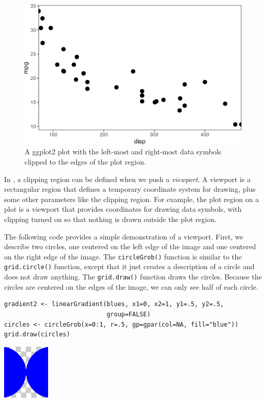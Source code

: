 \begin{figure}[h]
\includegraphics[width=1\linewidth]{murrell-definitions-2023_files/figure-latex/ggplot2clip-1} \caption{A ggplot2 plot with the left-most and right-most data symbols clipped to the edges of the plot region.}\label{fig:ggplot2clip}
\end{figure}

In , a clipping region can be defined when we push a \emph{viewport}.
A viewport is a rectangular region that defines a temporary coordinate
system for drawing, plus some other parameters like the clipping region.
For example, the plot region on a  plot is a 
viewport that provides coordinates for drawing data symbols, with
clipping turned on so that nothing is drawn outside the plot region.

The following code provides a simple demonstration of a viewport.
First, we describe two circles, one centered on the left edge of
the image and one centered on the right edge of the image.
The \texttt{circleGrob()} function is similar
to the \texttt{grid.circle()} function, except that it just creates a
description of a circle and does not draw anything.
The \texttt{grid.draw()} function draws the circles.
Because the circles are centered on the edges of the image,
we can only see half of each circle.

\begin{verbatim}
gradient2 <- linearGradient(blues, x1=0, x2=1, y1=.5, y2=.5,
                            group=FALSE)
circles <- circleGrob(x=0:1, r=.5, gp=gpar(col=NA, fill="blue"))
grid.draw(circles)
\end{verbatim}

\includegraphics{murrell-definitions-2023_files/figure-latex/unnamed-chunk-14-1.png}

